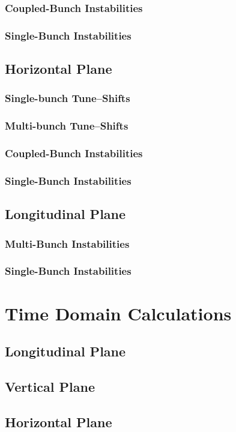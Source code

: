 \subsubsection{Coupled-Bunch Instabilities}
\subsubsection{Single-Bunch Instabilities}
\subsection{Horizontal Plane}
\subsubsection{Single-bunch Tune--Shifts}
\subsubsection{Multi-bunch Tune--Shifts}
\subsubsection{Coupled-Bunch Instabilities}
\subsubsection{Single-Bunch Instabilities}
\subsection{Longitudinal Plane}
\subsubsection{Multi-Bunch Instabilities}
\subsubsection{Single-Bunch Instabilities}
\section{Time Domain Calculations}
\subsection{Longitudinal Plane}
\subsection{Vertical Plane}
\subsection{Horizontal Plane}


